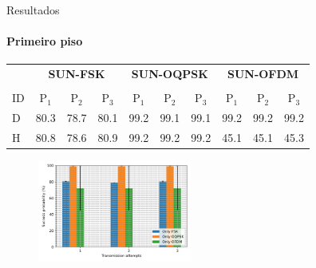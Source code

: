 \documentclass[c]{beamer}
\begin{document}
\begin{darkframes}
  \begin{frame}{Resultados}
    \framesubtitle{Primeiro piso}
    \begin{table}[!b]
      \centering
      {\carlitoTLF %
        \begin{tabularx}{\textwidth}{Xccccccccc}
              & \multicolumn{3}{c|}{\textbf{SUN-FSK}} & \multicolumn{3}{c|}{\textbf{SUN-OQPSK}} & \multicolumn{3}{c}{\textbf{SUN-OFDM}}                                                             \\ \cline{2-10}                                                       \\
          ID  & {P$_1$}                               & {P$_2$}                                 & {P$_3$}                               & {P$_1$} & {P$_2$} & {P$_3$} & {P$_1$} & {P$_2$} & {P$_3$} \\ \hline
          \toprule
          {D} & 80.3                                  & 78.7                                    & 80.1                                  & 99.2    & 99.1    & 99.1    & 99.2    & 99.2    & 99.2    \\ \hline
          {H} & 80.8                                  & 78.6                                    & 80.9                                  & 99.2    & 99.2    & 99.2    & 45.1    & 45.1    & 45.3    \\ \hline
        \end{tabularx}}
    \end{table}
    \begin{figure}
      \centering
      \includegraphics[width=0.45\textwidth]{resources/mod_1_floor.png}
    \end{figure}
  \end{frame}


\end{darkframes}
\end{document}
